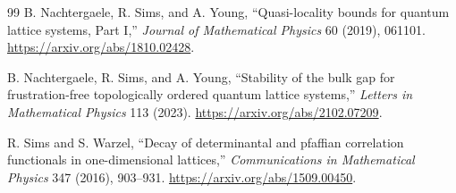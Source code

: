 \documentclass[12pt]{article}
\theoremstyle{definition}
\theoremstyle{remark}
\begin{document}
\begin{thebibliography}{99}
B. Nachtergaele, R. Sims, and A. Young,
``Quasi-locality bounds for quantum lattice systems, Part I,''
\emph{Journal of Mathematical Physics} 60 (2019), 061101.
\url{https://arxiv.org/abs/1810.02428}.

B. Nachtergaele, R. Sims, and A. Young,
``Stability of the bulk gap for frustration-free topologically ordered quantum
lattice systems,''
\emph{Letters in Mathematical Physics} 113 (2023).
\url{https://arxiv.org/abs/2102.07209}.

R. Sims and S. Warzel,
``Decay of determinantal and pfaffian correlation functionals in one-dimensional
lattices,''
\emph{Communications in Mathematical Physics} 347 (2016), 903--931.
\url{https://arxiv.org/abs/1509.00450}.

\end{thebibliography}
\end{document}
